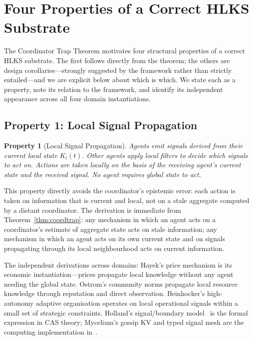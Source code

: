 \documentclass[11pt]{article}
\theoremstyle{definition}
\theoremstyle{plain}
\theoremstyle{plain}
\newtheorem*{property}{Property}
\begin{document}
\section{Four Properties of a Correct HLKS Substrate}
\label{sec:properties}

The Coordinator Trap Theorem motivates four structural properties of a correct HLKS
substrate. The first follows directly from the theorem; the others are design
corollaries---strongly suggested by the framework rather than strictly entailed---and
we are explicit below about which is which. We state each as a property, note its
relation to the framework, and identify its independent appearance across all four
domain instantiations.

\subsection{Property 1: Local Signal Propagation}

\begin{property}[Local Signal Propagation]
Agents emit signals derived from their current local state $K_i(t)$. Other
agents apply local filters to decide which signals to act on. Actions are
taken locally on the basis of the receiving agent's current state and the
received signal. No agent requires global state to act.
\end{property}

This property directly avoids the coordinator's epistemic error: each action
is taken on information that is current and local, not on a stale aggregate
computed by a distant coordinator. The derivation is immediate from
Theorem~\ref{thm:coordtrap}: any mechanism in which an agent acts on a
coordinator's estimate of aggregate state acts on stale information; any
mechanism in which an agent acts on its own current state and on signals
propagating through its local neighbourhood acts on current information.

The independent derivations across domains: Hayek's price mechanism is its
economic instantiation---prices propagate local knowledge without any agent
needing the global state. Ostrom's community norms propagate local resource
knowledge through reputation and direct observation. Beinhocker's
high-autonomy adaptive organisation operates on local operational signals
within a small set of strategic constraints. Holland's signal/boundary
model~\cite{holland2012} is the formal expression in CAS theory;
Mycelium's gossip KV and typed signal mesh are the computing implementation
in~\cite{nicholson2026}.
\end{document}
